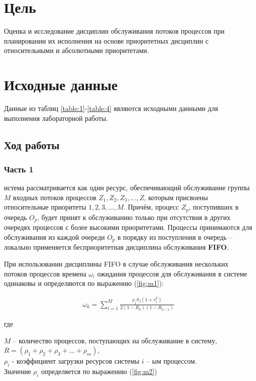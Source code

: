 \section*{Цель}

Оценка и исследование дисциплин обслуживания потоков процессов при планировании их исполнения на основе приоритетных дисциплин с относительными и абсолютными приоритетами.

\section*{Исходные данные}

Данные из таблиц \ref{table:1}-\ref{table:4} являются исходными данными для выполнения лабораторной работы.






\subsection*{Ход работы}

\subsubsection*{Часть 1}

истема рассматривается как один ресурс, обеспечивающий обслуживание группы $M$ входных потоков процессов $Z_1, Z_2, Z_3, ..., Z$, которым присвоены относительные приоритеты $1,2,3,...,M$. Причём, процесс $Z_p$, поступивших в очередь $O_p$, будет принят к обслуживанию только при отсутствия в других очередях процессов с более высокими приоритетами. Процессы принимаются для обслуживания из каждой очереди $O_p$ в порядку из поступления в очередь -- локально применяется бесприоритетная дисциплина обслуживания \textbf{FIFO}.

При использовании дисциплины FIFO в случае обслуживания нескольких потоков процессов времена $\omega_i$ ожидания процессов для обслуживания в системе одинаковы и определяются по выражению (\ref{fig:m1}):

\begin{align}
	\omega_k = \sum_{i=1}^{M}\frac{\rho_j\vartheta_j(1+v_i^2)}{2(1-R_k)(1-R_{k-1})}
	\label{fig:m1}
\end{align}

где

$M$ -- количество процессов, поступающих на обслуживание в систему, \\
$R = (\rho_1 + \rho_2 + \rho_3 + ... + \rho_m)$, \\
$\rho_i$ - коэффициент загрузки ресурсов системы $i$ -- ым процессом. \\
Значение $\rho_i$ определяется по выражению (\ref{fig:m2})\\

